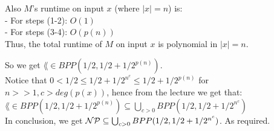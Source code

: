 Also $M$'s runtime on input $x$ (where $|x|=n$) is: \\
- For steps (1-2): $O(1)$ \\
- For steps (3-4): $O(p(n))$  \\
Thus, the total runtime of $M$ on input $x$ is polynomial in $|x|=n$.

So we get $\lang \in BPP(1/2, 1/2 + 1/2^{p(n)})$. \\
Notice that $0 < 1/2 \leq 1/2 + 1/2^{n^c} \leq 1/2 + 1/2^{p(n)}$ for $n >> 1, c > deg(p(x))$, hence from the lecture we get that: \\
$\lang \in BPP(1/2, 1/2 + 1/2^{p(n)}) \subseteq \bigcup_{c>0} BPP(1/2, 1/2 + 1/2^{n^c})$ \\
In conclusion, we get $\mathcal{N}\mathcal{P} \subseteq \bigcup_{c>0} BPP(1/2, 1/2 + 1/2^{n^c})$. As required.


